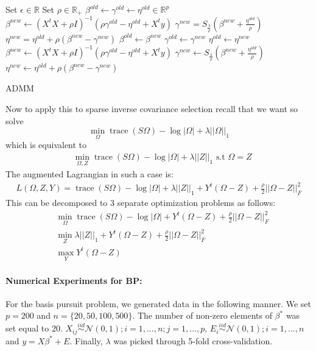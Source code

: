\documentclass[12pt, leqno]{article}
\newcommand{\norm}[1]{\left|\left|#1\right|\right|}
\newcommand{\abs}[1]{\left|#1\right|}
\DeclareMathOperator*{\trace}{trace}
\theoremstyle{remark}
\begin{document}
\begin{algorithm}[H]
\begin{algorithmic}
\State Set $\epsilon \in \mathbb{R}$
\State Set $\rho \in \mathbb{R}_+$
\State $\beta^{old} \gets \gamma^{old} \gets \eta^{old} \in \mathbb{R}^p$
   \State $\beta^{new} \gets (X^tX + \rho I)^{-1}(\rho \gamma^{old} - \eta^{old} + X^t y)$
\State $\gamma^{new} = S_{\frac{\lambda}{\rho}}(\beta^{new} + \frac{\eta^{old}}{\rho})$
\State  $\eta^{new} = \eta^{old}+ \rho(\beta^{new} - \gamma^{new})$
\While {$\norm{\beta^{new} - \beta^{old}}_{\infty} \geq \epsilon$}
	\State $\beta^{old} \gets \beta^{new}$
\State $\gamma^{old} \gets \gamma^{new}$
\State $\eta^{old} \gets \eta^{new}$
   \State $\beta^{new} \gets (X^tX + \rho I)^{-1}(\rho \gamma^{old} - \eta^{old} + X^t y)$
\State $\gamma^{new} \gets S_{\frac{\lambda}{\rho}}(\beta^{new} + \frac{\eta^{old}}{\rho})$
\State  $\eta^{new} \gets \eta^{old}+ \rho(\beta^{new} - \gamma^{new})$
    \EndWhile
\end{algorithmic}
\caption{ADMM}
\end{algorithm}

Now to apply this to sparse inverse covariance selection recall that we want so solve
$$
\min_{\Omega} \trace(S\Omega) - \log \abs{\Omega} + \lambda \norm{\Omega}_1
$$
which is equivalent to
\begin{align*}
&\min_{\Omega,Z} \trace(S\Omega) - \log \abs{\Omega} + \lambda \norm{Z}_1 \text{ s.t } \Omega = Z \end{align*}
The augmented Lagrangian in such a case is:
\begin{align*}
L({\Omega,Z,Y}) =  \trace(S\Omega) - \log \abs{\Omega} + \lambda \norm{Z}_1 + Y^t (\Omega - Z) + \frac{\rho}{2} \norm{\Omega-Z}_F^2
\end{align*}
This can be decomposed to 3 separate optimization problems as follows:
\begin{align*}
&\min_{\Omega} \trace(S\Omega) - \log \abs{\Omega} + Y^t (\Omega - Z) + \frac{\rho}{2} \norm{\Omega-Z}_F^2\\
&\min_{Z}  \lambda \norm{Z}_1 + Y^t (\Omega - Z) + \frac{\rho}{2} \norm{\Omega-Z}_F^2\\
&\max_{Y}  Y^t (\Omega - Z)
\end{align*}

\paragraph{Numerical Experiments for BP:} For the basis pursuit problem, we generated data in the following manner. We set $p = 200$ and $n = \{20,50,100,500\}$. The number of non-zero elements of $\beta^*$ was set equal to $20$. $X_{ij} \overset{iid}{\sim} \mathcal{N}(0,1); i = 1,...,n; j = 1,...,p$, $E_{i} \overset{iid}{\sim} \mathcal{N}(0,1); i = 1,...,n$ and $y = X\beta^* + E$. Finally, $\lambda$ was picked through 5-fold cross-validation. 
\end{document}
